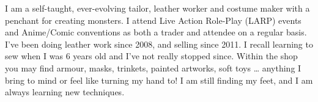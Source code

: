 I am a self-taught, ever-evolving tailor, leather worker and costume
maker with a penchant for creating monsters. I attend Live Action
Role-Play (LARP) events and Anime/Comic conventions as both a trader
and attendee on a regular basis. I’ve been doing leather work since
2008, and selling since 2011. I recall learning to sew when I was 6
years old and I’ve not really stopped since. Within the shop you may
find armour, masks, trinkets, painted artworks, soft toys \ldots
anything I bring to mind or feel like turning my hand to! I am still
finding my feet, and I am always learning new techniques.
